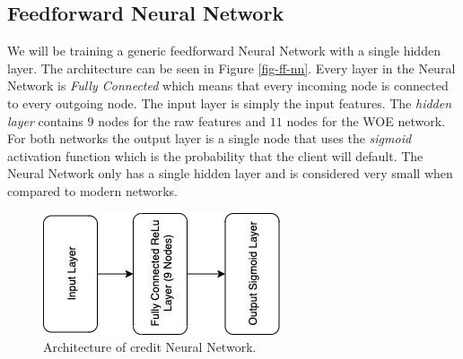  \begin{table}[h!]
 \footnotesize
\begin{center}
\par\end{center}
\caption{The results of fitting a logistic regression model on the cervical cancer dataset. Shown are the features used in the model, their estimated weights and corresponding odds ratios, and the standard errors of the estimated weights. \cite{molnar2019}}\label{table:logistic}
\end{table}

\subsection{Feedforward Neural Network}
We will be training a generic feedforward Neural Network with a single hidden layer. The architecture can be seen in Figure \ref{fig-ff-nn}. Every layer in the Neural Network is \emph{Fully Connected} which means that every incoming node is connected to every outgoing node. The input layer is simply the input features. The \emph{hidden layer} contains $9$ nodes for the raw features and $11$ nodes for the WOE network. For both networks the output layer is a single node that uses the \emph{sigmoid} activation function which is the probability that the client will default. The Neural Network only has a single hidden layer and is considered very small when compared to modern networks.

\begin  {figure}[!htpb]
\centering
  \includegraphics[width=0.5\linewidth]{Credit_Images/Credit_Architecture.png}
   \caption{Architecture of credit Neural Network.}
    \label{fig:weight-tab}
\end{figure}

